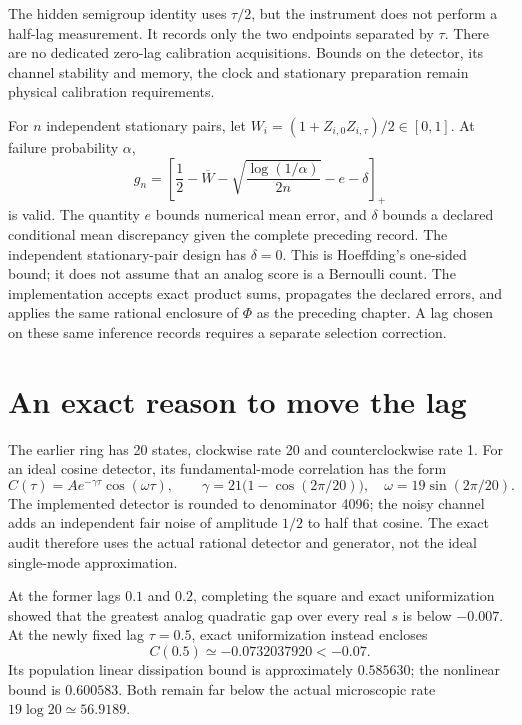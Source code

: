 The hidden semigroup identity uses $\tau/2$, but the instrument does not
perform a half-lag measurement. It records only the two endpoints separated
by $\tau$. There are no dedicated zero-lag calibration acquisitions. Bounds
on the detector, its channel stability and memory, the clock and stationary
preparation remain physical calibration requirements.

For $n$ independent stationary pairs, let
$W_i=(1+Z_{i,0}Z_{i,\tau})/2\in[0,1]$. At failure probability $\alpha$,
\begin{equation}
 g_n=\left[\frac12-\overline W
   -\sqrt{\frac{\log(1/\alpha)}{2n}}-e-\delta\right]_+
 \label{eq:pa-retiming-confidence}
\end{equation}
is valid. The quantity $e$ bounds numerical mean error, and $\delta$ bounds
a declared conditional mean discrepancy given the complete preceding record.
The independent stationary-pair design has $\delta=0$. This is Hoeffding's
one-sided bound; it does not assume that an analog score is a Bernoulli
count. The implementation accepts exact product sums, propagates the declared
errors, and applies the same rational enclosure of $\Phi$ as the preceding
chapter. A lag chosen on these same inference records requires a separate
selection correction.

\section{An exact reason to move the lag}
The earlier ring has 20 states, clockwise rate 20 and counterclockwise rate 1.
For an ideal cosine detector, its fundamental-mode correlation has the form
\[
 C(\tau)=A e^{-\gamma\tau}\cos(\omega\tau),\qquad
 \gamma=21\bigl(1-\cos(2\pi/20)\bigr),\quad
 \omega=19\sin(2\pi/20).
\]
The implemented detector is rounded to denominator 4096; the noisy channel
adds an independent fair noise of amplitude $1/2$ to half that cosine.
The exact audit therefore uses the actual rational detector and generator,
not the ideal single-mode approximation.

At the former lags $0.1$ and $0.2$, completing the square and exact
uniformization showed that the greatest analog quadratic gap over every real
$s$ is below $-0.007$. At the newly fixed lag $\tau=0.5$, exact uniformization
instead encloses
\[
 C(0.5)\simeq-0.0732037920< -0.07.
\]
Its population linear dissipation bound is approximately $0.585630$; the
nonlinear bound is $0.600583$. Both remain far below the actual microscopic
rate $19\log20\simeq56.9189$.

